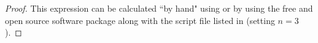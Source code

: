 \begin{proof}
This expression can be calculated ``by hand" using 
or by using the free and open source software package 
along with the script file listed in  (setting $n=3$).
\end{proof}

